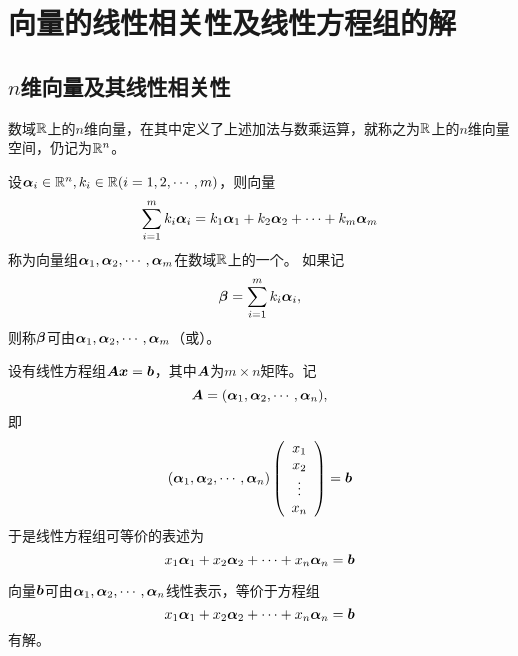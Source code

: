 \section{向量的线性相关性及线性方程组的解}
\subsection{$n$维向量及其线性相关性}


\begin{frame}
  \begin{dingyi}[向量空间]
    数域$\mathbb R$上的$n$维向量，在其中定义了上述加法与数乘运算，就称之为$\mathbb R$上的$n$维向量空间，仍记为$\mathbb R^n$。
  \end{dingyi}
\end{frame}

\begin{frame}
  \begin{dingyi}[线性表示]
    设$\boldsymbol{\alpha}_i\in \mathbb R^n, k_i \in \mathbb R (i=1,2,\cdots,m)$，则向量
    $$
    \sum_{i=1}^m k_i\boldsymbol{\alpha}_i = k_1\boldsymbol{\alpha}_1 + k_2\boldsymbol{\alpha}_2+\cdots + k_m\boldsymbol{\alpha}_m
    $$
    称为向量组$\boldsymbol{\alpha}_1,\boldsymbol{\alpha}_2,\cdots,\boldsymbol{\alpha}_m$在数域$\mathbb R$上的一个。  如果记
    $$\boldsymbol{\beta}=\sum_{i=1}^m k_i\boldsymbol{\alpha}_i,$$
    则称$\boldsymbol{\beta}$可由$\boldsymbol{\alpha}_1,\boldsymbol{\alpha}_2,\cdots,\boldsymbol{\alpha}_m$（或）。
  \end{dingyi}
\end{frame}

\begin{frame}
  设有线性方程组$\boldsymbol{A}{\boldsymbol{x}}={\boldsymbol{b}}$，其中$\boldsymbol{A}$为$m\times n$矩阵。记
  $$\boldsymbol{A}=(\boldsymbol{\alpha}_1,\boldsymbol{\alpha}_2,\cdots,\boldsymbol{\alpha}_n),$$
  即
  $$
  (\boldsymbol{\alpha}_1,\boldsymbol{\alpha}_2,\cdots,\boldsymbol{\alpha}_n) \left(
    \begin{array}{c}
      x_1\\
      x_2\\
      \vdots\\
      x_n
    \end{array}
  \right)={\boldsymbol{b}}
  $$
  于是线性方程组可等价的表述为
  $$
  x_1\boldsymbol{\alpha}_1+x_2\boldsymbol{\alpha}_2+\cdots+x_n\boldsymbol{\alpha}_n={\boldsymbol{b}}
  $$
\end{frame}

\begin{frame}
  \begin{zhu*}
    向量${\boldsymbol{b}}$可由$\boldsymbol{\alpha}_1,\boldsymbol{\alpha}_2,\cdots,\boldsymbol{\alpha}_n$线性表示，等价于方程组
    $$
    x_1\boldsymbol{\alpha}_1+x_2\boldsymbol{\alpha}_2+\cdots+x_n\boldsymbol{\alpha}_n={\boldsymbol{b}}
    $$
    有解。
  \end{zhu*}
\end{frame}

